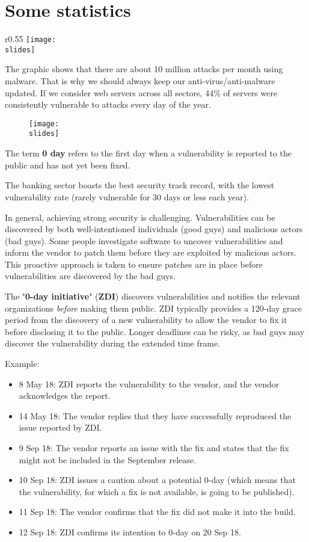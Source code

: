 \section{Some statistics}
\begin{wrapfigure}{r}{0.55\textwidth}
  \centering
  \texttt{[image: \\slides]}
\end{wrapfigure}
The graphic shows that there are about 10 million attacks per month using malware. That is why we should always keep our anti-virus/anti-malware updated.
If we consider web servers across all sectors, 44\% of servers were consistently vulnerable to attacks every day of the year.
\begin{figure}[h]
  \centering
  \texttt{[image: \\slides]}
\end{figure}

The term \textbf{0 day} refers to the first day when a vulnerability is reported to the public and has not yet been fixed.

The banking sector boasts the best security track record, with the lowest vulnerability rate (rarely vulnerable for 30 days or less each year).

In general, achieving strong security is challenging. Vulnerabilities can be discovered by both well-intentioned individuals (good guys) and malicious actors (bad guys). Some people investigate software to uncover vulnerabilities and inform the vendor to patch them before they are exploited by malicious actors. This proactive approach is taken to ensure patches are in place before vulnerabilities are discovered by the bad guys.

The "\textbf{0-day initiative}" (\textbf{ZDI}) discovers vulnerabilities and notifies the relevant organizations \emph{before} making them public. ZDI typically provides a 120-day grace period from the discovery of a new vulnerability to allow the vendor to fix it before disclosing it to the public. Longer deadlines can be risky, as bad guys may discover the vulnerability during the extended time frame.

\vspace{5mm}
Example:
\begin{itemize}
  \item 8 May 18: ZDI reports the vulnerability to the vendor, and the vendor acknowledges the report.
  \item 14 May 18: The vendor replies that they have successfully reproduced the issue reported by ZDI.
  \item 9 Sep 18: The vendor reports an issue with the fix and states that the fix might not be included in the September release.
  \item 10 Sep 18: ZDI issues a caution about a potential 0-day (which means that the vulnerability, for which a fix is not available, is going to be published).
  \item 11 Sep 18: The vendor confirms that the fix did not make it into the build.
  \item 12 Sep 18: ZDI confirms its intention to 0-day on 20 Sep 18.
\end{itemize}



